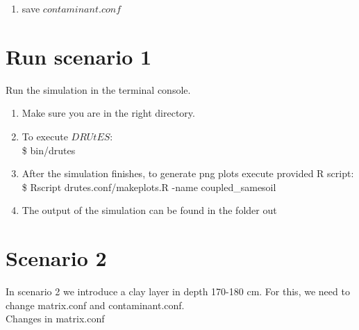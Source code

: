 \documentclass[
10pt, %
a4paper, %
oneside, %
headinclude,footinclude, %
BCOR5mm, %
]{scrartcl}
\begin{document}
\begin{enumerate}
{\begin{tabular}{|c | c | c|c |}
			\hline
		\end{tabular}
	}
\item save $contaminant.conf$
\end{enumerate}

\section*{Run scenario 1}
Run the simulation in the terminal console.
\begin{enumerate}
\item Make sure you are in the right directory. 
\item To execute $DRUtES$: \\
\$ bin/drutes
\item After the simulation finishes, to generate png plots execute provided R script: \\
\$ Rscript drutes.conf/makeplots.R -name coupled\_samesoil \\
\item The output of the simulation can be found in the folder out
\end{enumerate}

\section*{Scenario 2}

In scenario 2 we introduce a clay layer in depth 170-180 cm. For this, we need to change matrix.conf and contaminant.conf. \\

Changes in matrix.conf 
\end{document}
